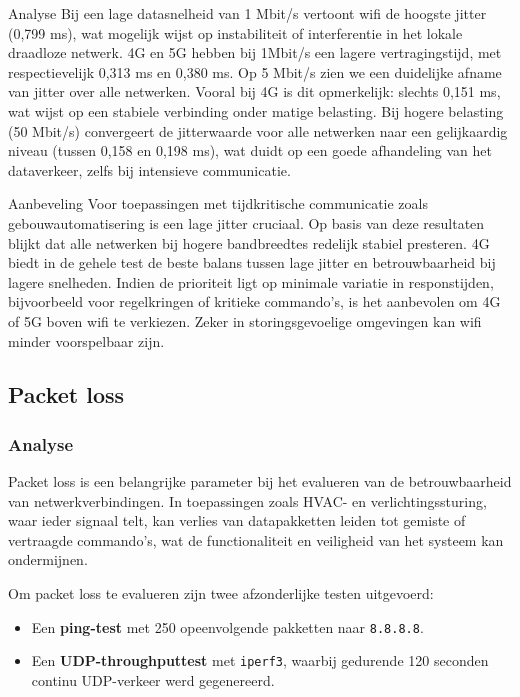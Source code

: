 Analyse
Bij een lage datasnelheid van 1 Mbit/s vertoont wifi de hoogste jitter (0,799 ms), wat mogelijk wijst op instabiliteit of interferentie in het lokale draadloze netwerk. 4G en 5G hebben bij 1Mbit/s een lagere vertragingstijd, met respectievelijk 0,313 ms en 0,380 ms. Op 5 Mbit/s zien we een duidelijke afname van jitter over alle netwerken. Vooral bij 4G is dit opmerkelijk: slechts 0,151 ms, wat wijst op een stabiele verbinding onder matige belasting. Bij hogere belasting (50 Mbit/s) convergeert de jitterwaarde voor alle netwerken naar een gelijkaardig niveau (tussen 0,158 en 0,198 ms), wat duidt op een goede afhandeling van het dataverkeer, zelfs bij intensieve communicatie. 

Aanbeveling 
Voor toepassingen met tijdkritische communicatie zoals gebouwautomatisering is een lage jitter cruciaal. Op basis van deze resultaten blijkt dat alle netwerken bij hogere bandbreedtes redelijk stabiel presteren. 4G biedt in de gehele test de beste balans tussen lage jitter en betrouwbaarheid bij lagere snelheden. Indien de prioriteit ligt op minimale variatie in responstijden, bijvoorbeeld voor regelkringen of kritieke commando’s, is het aanbevolen om 4G of 5G boven wifi te verkiezen. Zeker in storingsgevoelige omgevingen kan wifi minder voorspelbaar zijn.


\subsection{Packet loss}

\subsubsection{Analyse}
Packet loss is een belangrijke parameter bij het evalueren van de betrouwbaarheid van netwerkverbindingen. In toepassingen zoals HVAC- en verlichtingssturing, waar ieder signaal telt, kan verlies van datapakketten leiden tot gemiste of vertraagde commando’s, wat de functionaliteit en veiligheid van het systeem kan ondermijnen.

Om packet loss te evalueren zijn twee afzonderlijke testen uitgevoerd:
\begin{itemize}
    \item Een \textbf{ping-test} met 250 opeenvolgende pakketten naar \texttt{8.8.8.8}.
    \item Een \textbf{UDP-throughputtest} met \texttt{iperf3}, waarbij gedurende 120 seconden continu UDP-verkeer werd gegenereerd.
\end{itemize}

